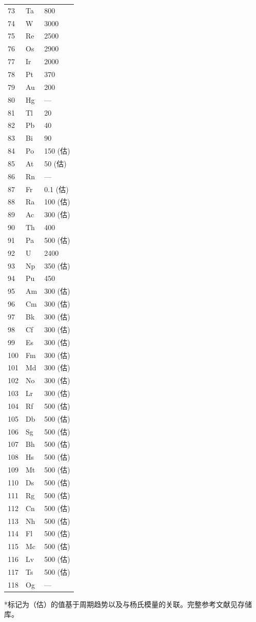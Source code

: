 \documentclass[12pt,a4paper]{article}
\begin{document}
\begin{longtable}{p{0.6cm}p{1.2cm}p{2.5cm}}
		73 & Ta & 800 \\
		74 & W  & 3000 \\
		75 & Re & 2500 \\
		76 & Os & 2900 \\
		77 & Ir & 2000 \\
		78 & Pt & 370 \\
		79 & Au & 200 \\
		80 & Hg & — \\
		81 & Tl & 20 \\
		82 & Pb & 40 \\
		83 & Bi & 90 \\
		84 & Po & 150 (估) \\
		85 & At & 50 (估) \\
		86 & Rn & — \\
		87 & Fr & 0.1 (估) \\
		88 & Ra & 100 (估) \\
		89 & Ac & 300 (估) \\
		90 & Th & 400 \\
		91 & Pa & 500 (估) \\
		92 & U  & 2400 \\
		93 & Np & 350 (估) \\
		94 & Pu & 450 \\
		95 & Am & 300 (估) \\
		96 & Cm & 300 (估) \\
		97 & Bk & 300 (估) \\
		98 & Cf & 300 (估) \\
		99 & Es & 300 (估) \\
		100& Fm & 300 (估) \\
		101& Md & 300 (估) \\
		102& No & 300 (估) \\
		103& Lr & 300 (估) \\
		104& Rf & 500 (估) \\
		105& Db & 500 (估) \\
		106& Sg & 500 (估) \\
		107& Bh & 500 (估) \\
		108& Hs & 500 (估) \\
		109& Mt & 500 (估) \\
		110& Ds & 500 (估) \\
		111& Rg & 500 (估) \\
		112& Cn & 500 (估) \\
		113& Nh & 500 (估) \\
		114& Fl & 500 (估) \\
		115& Mc & 500 (估) \\
		116& Lv & 500 (估) \\
		117& Ts & 500 (估) \\
		118& Og & — \\
		\bottomrule
	\end{longtable}
	*标记为（估）的值基于周期趋势以及与杨氏模量的关联。完整参考文献见存储库。
	
\end{document}
